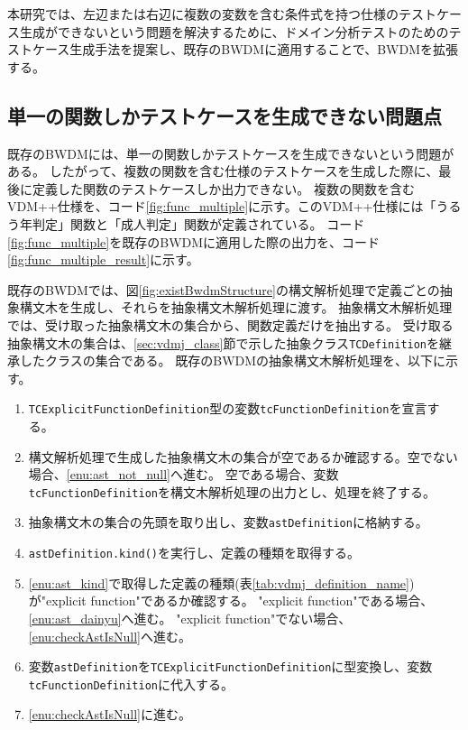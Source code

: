 \documentclass[uplatex, report, a4j, 10pt]{jsbook}
\newcommand\ttt[1]{\texttt{#1}}
\newcommand{\tool}{BWDM}
\begin{document}
本研究では、左辺または右辺に複数の変数を含む条件式を持つ仕様のテストケース生成ができないという問題を解決するために、ドメイン分析テストのためのテストケース生成手法を提案し、既存のBWDMに適用することで、BWDMを拡張する。

\subsection{単一の関数しかテストケースを生成できない問題点}\label{sec:probrem_only_function}
既存の\tool{}には、単一の関数しかテストケースを生成できないという問題がある。
したがって、複数の関数を含む仕様のテストケースを生成した際に、最後に定義した関数のテストケースしか出力できない。
複数の関数を含むVDM++仕様を、コード\ref{fig:func_multiple}に示す。このVDM++仕様には「うるう年判定」関数と「成人判定」関数が定義されている。
コード\ref{fig:func_multiple}を既存のBWDMに適用した際の出力を、コード\ref{fig:func_multiple_result}に示す。

既存のBWDMでは、図\ref{fig:existBwdmStructure}の構文解析処理で定義ごとの抽象構文木を生成し、それらを抽象構文木解析処理に渡す。
抽象構文木解析処理では、受け取った抽象構文木の集合から、関数定義だけを抽出する。
受け取る抽象構文木の集合は、\ref{sec:vdmj_class}節で示した抽象クラス\ttt{TCDefinition}を継承したクラスの集合である。
既存のBWDMの抽象構文木解析処理を、以下に示す。

\newcommand{\TCExplicitFunctionDefinition}{\ttt{TCExplicitFunctionDefinition}}
\newcommand{\tcFunctionDefinition}{\ttt{tcFunctionDefinition}}
\newcommand{\astDefinition}{\ttt{astDefinition}}

\begin{enumerate}
  \item \TCExplicitFunctionDefinition{}型の変数\tcFunctionDefinition{}を宣言する。
  \item\label{enu:checkAstIsNull} 構文解析処理で生成した抽象構文木の集合が空であるか確認する。空でない場合、\ref{enu:ast_not_null}へ進む。
        空である場合、変数\tcFunctionDefinition{}を構文木解析処理の出力とし、処理を終了する。
  \item\label{enu:ast_not_null} 抽象構文木の集合の先頭を取り出し、変数\astDefinition{}に格納する。
  \item\label{enu:ast_kind} \astDefinition{}\ttt{.kind()}を実行し、定義の種類を取得する。
  \item \ref{enu:ast_kind}で取得した定義の種類(表\ref{tab:vdmj_definition_name})が"explicit function"であるか確認する。
        "explicit function"である場合、\ref{enu:ast_dainyu}へ進む。
        "explicit function"でない場合、\ref{enu:checkAstIsNull}へ進む。
  \item\label{enu:ast_dainyu} 変数\astDefinition{}を\TCExplicitFunctionDefinition{}に型変換し、変数\tcFunctionDefinition{}に代入する。
  \item \ref{enu:checkAstIsNull}に進む。
\end{enumerate}
\end{document}
